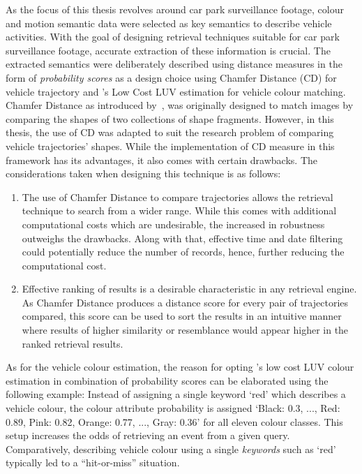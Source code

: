 As the focus of this thesis revolves around car park surveillance footage, colour and motion semantic data were selected as key semantics to describe vehicle activities. 
With the goal of designing retrieval techniques suitable for car park surveillance footage, accurate extraction of these information is crucial.
The extracted semantics were deliberately described using distance measures in the form of \textit{probability scores} as a design choice using Chamfer Distance (CD) for vehicle trajectory and 's Low Cost LUV estimation for vehicle colour matching.
Chamfer Distance as introduced by~, was originally designed to match images by comparing the shapes of two collections of shape fragments.
However, in this thesis, the use of CD was adapted to suit the research problem of comparing vehicle trajectories' shapes. While the implementation of CD measure in this framework has its advantages, it also comes with certain drawbacks. The considerations taken when designing this technique is as follows:
\begin{enumerate}
    \item The use of Chamfer Distance to compare trajectories allows the retrieval technique to search from a wider range. While this comes with additional computational costs which are undesirable, the increased in robustness outweighs the drawbacks. Along with that, effective time and date filtering could potentially reduce the number of records, hence, further reducing the computational cost.
    \item Effective ranking of results is a desirable characteristic in any retrieval engine. As Chamfer Distance produces a distance score for every pair of trajectories compared, this score can be used to sort the results in an intuitive manner where results of higher similarity or resemblance would appear higher in the ranked retrieval results.
\end{enumerate}

As for the vehicle colour estimation, 
the reason for opting \cite{riemersma}'s low cost LUV colour estimation in combination of probability scores can be elaborated using the following example: Instead of assigning a single keyword `red' which describes a vehicle colour, the colour attribute probability is assigned `Black: 0.3, ..., Red: 0.89, Pink: 0.82, Orange: 0.77, ..., Gray: 0.36' for all eleven colour classes. This setup increases the odds of retrieving an event from a given query. Comparatively, describing vehicle colour using a single \textit{keywords} such as `red' typically led to a ``hit-or-miss'' situation.

